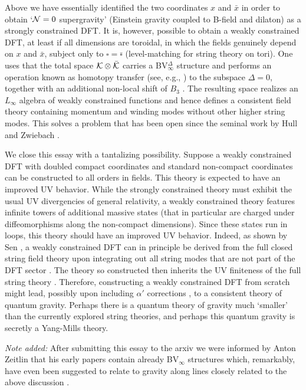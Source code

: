 \documentclass[12pt]{article}\pdfoutput=1
\def\B{\square}
\begin{document}
Above we have essentially  identified the two coordinates $x$ and $\bar{x}$ in order 
to obtain `${\cal N}=0$ supergravity' (Einstein gravity coupled to B-field and dilaton) 
as a  strongly constrained DFT. It is, however, possible to obtain a weakly constrained DFT, 
at least if all dimensions are toroidal, in which the fields genuinely depend on $x$ and $\bar{x}$, subject only 
to $\B=\bar{\B}$ (level-matching for  string theory on tori). 
One uses that the total  space ${\cal K}\otimes \bar{\cal K}$ carries a BV$_{\infty}^{\Delta}$  structure 
and performs an operation known as homotopy transfer (see, e.g., \cite{Vallette,Crainic,Arvanitakis:2020rrk,Arvanitakis:2021ecw}) 
to the subspace $\Delta=0$, together with an additional non-local shift of $B_3$ \cite{Bonezzitoappear}. 
The resulting space realizes an $L_{\infty}$ algebra of weakly constrained functions and hence defines a 
consistent field theory containing  momentum and winding modes without other higher string modes. 
This solves a 
problem that has been open since the seminal work by Hull and Zwiebach \cite{Hull:2009mi}. 



We close this essay with a tantalizing possibility. Suppose  a weakly constrained DFT with doubled compact coordinates 
and standard non-compact coordinates can be constructed to all orders in fields. This theory  
is expected to have an  
improved UV behavior.   
While the strongly constrained theory must exhibit the usual UV divergencies of 
general relativity, a weakly constrained theory features infinite towers of additional massive states 
(that in particular are charged under diffeomorphisms along the non-compact dimensions). Since these states 
run in loops, this theory should have an improved UV behavior.  
Indeed, as shown by Sen \cite{Sen:2016qap}, a weakly constrained DFT can in principle 
be derived from the full closed string field theory upon integrating out all string modes that are not part of 
the DFT sector \cite{Arvanitakis:2021ecw}. 
The theory so constructed then inherits the UV finiteness of the full string theory \cite{Sen:2016qap}. 
Therefore, constructing a weakly constrained DFT from scratch might lead, possibly upon including $\alpha'$ corrections \cite{Hohm:2013jaa,Hohm:2014xsa},  to a consistent theory of 
quantum gravity. 
Perhaps there is a quantum theory of gravity much `smaller' than the currently explored string theories, 
and perhaps this quantum gravity is  secretly a Yang-Mills theory. 

\textit{Note added:} After submitting this essay to the arxiv we were informed by Anton Zeitlin 
that his early papers \cite{Zeitlin:2008cc,Zeitlin:2009tj} contain already BV$_{\infty}$ structures 
which, remarkably, have even been suggested to relate to gravity along lines closely related to the
above discussion 
\cite{Zeitlin:2014xma}. 
\end{document}
